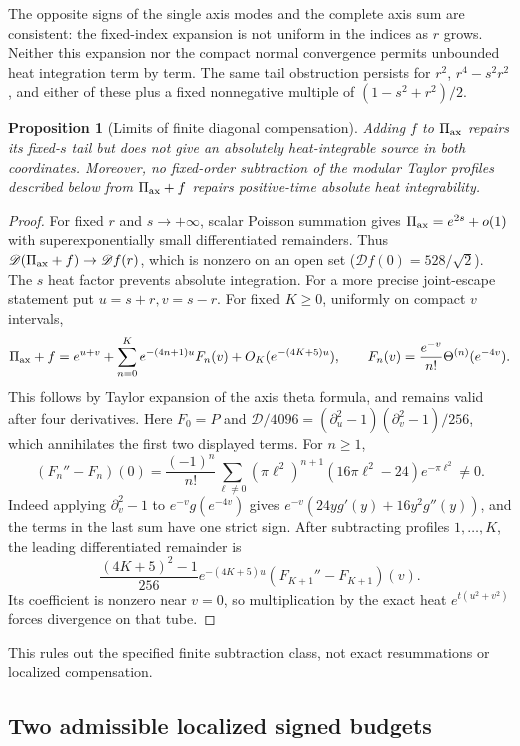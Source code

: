 \documentclass[11pt]{article}
\numberwithin{equation}{section}
\newtheorem{proposition}[theorem]{Proposition}
\theoremstyle{definition}
\theoremstyle{remark}
\begin{document}
The opposite signs of the single axis modes and the complete axis sum
are consistent: the fixed-index expansion is not uniform in the indices
as $r$ grows.  Neither this expansion nor the compact normal convergence
permits unbounded heat integration term by term.  The same tail
obstruction persists for $r^2$, $r^4-s^2r^2$, and either of these plus
a fixed nonnegative multiple of $(1-s^2+r^2)/2$.

\begin{proposition}[Limits of finite diagonal compensation]
\label{upd:diagonal-compensation}
Adding $f$ to $\Pi_{\rm ax}$ repairs its fixed-$s$ tail but does not
give an absolutely heat-integrable source in both coordinates.
Moreover, no fixed-order subtraction of the modular Taylor profiles
described below from $\Pi_{\rm ax}+f$ repairs positive-time absolute
heat integrability.
\end{proposition}
\begin{proof}
For fixed $r$ and $s\to+\infty$, scalar Poisson summation gives
$\Pi_{\rm ax}=e^{2s}+o(1)$ with superexponentially small differentiated
remainders.  Thus $\mathscr D(\Pi_{\rm ax}+f)\to\mathscr Df(r)$,
which is nonzero on an open set ($\mathscr Df(0)=528/\sqrt2$).
The $s$ heat factor prevents absolute integration.
For a more precise joint-escape statement put $u=s+r,v=s-r$.
For fixed $K\ge0$, uniformly on compact $v$ intervals,
\[
 \Pi_{\rm ax}+f=e^{u+v}+\sum_{n=0}^{K}e^{-(4n+1)u}F_n(v)
                       +O_K(e^{-(4K+5)u}),\qquad
 F_n(v)=\frac{e^{-v}}{n!}\Theta^{(n)}(e^{-4v}).
\]
This follows by Taylor expansion of the axis theta formula, and remains
valid after four derivatives.  Here $F_0=P$ and
$\mathscr D/4096=(\partial_u^2-1)(\partial_v^2-1)/256$, which
annihilates the first two displayed terms. For $n\ge1$,
\[
 (F_n''-F_n)(0)=\frac{(-1)^n}{n!}\sum_{\ell\ne0}
   (\pi\ell^2)^{n+1}(16\pi\ell^2-24)e^{-\pi\ell^2}\ne0.
\]
Indeed applying $\partial_v^2-1$ to $e^{-v}g(e^{-4v})$ gives
$e^{-v}(24yg'(y)+16y^2g''(y))$, and the terms in the last sum
have one strict sign.  After subtracting profiles $1,\ldots,K$, the
leading differentiated remainder is
\[
 \frac{(4K+5)^2-1}{256}e^{-(4K+5)u}
                        (F_{K+1}''-F_{K+1})(v).
\]
Its coefficient is nonzero near $v=0$, so multiplication by the exact
heat $e^{t(u^2+v^2)}$ forces divergence on that tube.
\end{proof}
This rules out the specified finite subtraction class, not exact
resummations or localized compensation.

\subsection{Two admissible localized signed budgets}
\end{document}
